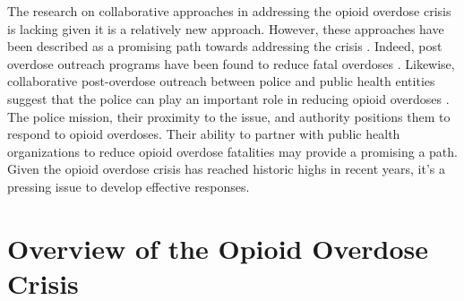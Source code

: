 The research on collaborative approaches in addressing the opioid overdose crisis is lacking given it is a relatively new approach. However, these approaches have been described as a promising path towards addressing the crisis \parencite{haegerich_evidence_2019, yatsco_alternatives_2020}. Indeed, post overdose outreach programs have been found to reduce fatal overdoses \parencite{xuan_association_2023}. Likewise, collaborative post-overdose outreach between police and public health entities suggest that the police can play an important role in reducing opioid overdoses \parencite{donnelly_law_2022}. The police mission, their proximity to the issue, and authority positions them to respond to opioid overdoses. Their ability to partner with public health organizations to reduce opioid overdose fatalities may provide a promising a path. Given the opioid overdose crisis has reached historic highs in recent years, it’s a pressing issue to develop effective responses. 

\section{\centering Overview of the Opioid Overdose Crisis}

